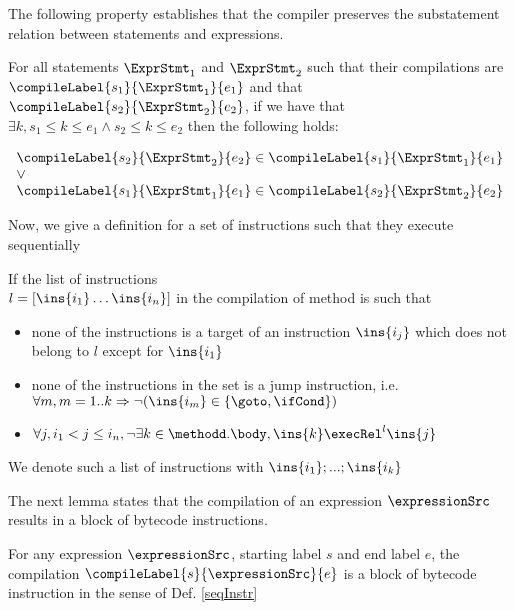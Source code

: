The following property establishes that the compiler preserves the substatement relation between statements and expressions.
\begin{compProp6}\label{compile:prop:compProp6}
For all statements $\ExprStmt_1$ and $\ExprStmt_2$ such that their compilations are 
 $\compileLabel{s_1}{\ExprStmt_1}{e_1} $ and that   $\compileLabel{s_2}{\ExprStmt_2}{e_2} $, if we have that 
$ \exists k,  s_1 \le k  \le e_1 \wedge s_2 \le k  \le e_2  $ then the following holds:

$$\begin{array}{l}
         \compileLabel{s_2}{\ExprStmt_2}{e_2}  \in \compileLabel{s_1}{\ExprStmt_1}{e_1}\\   
	 \vee \\
	 \compileLabel{s_1}{\ExprStmt_1}{e_1}  \in \compileLabel{s_2}{\ExprStmt_2}{e_2} 
\end{array}$$
\end{compProp6}

Now, we give a definition for a set of instructions such that they execute sequentially 
\begin{seqInstr} \label{seqInstr}
If the list of  instructions \\ $l  = \lbrack \ins{i_1} \ldots \ins{i_n} \rbrack$ in the compilation of method \methodd is such that 
 \begin{itemize}
              
      \item none of the instructions is a target of an instruction $\ins{i_j}$ which does not belong to $l$ except for $\ins{i_1}$
      \item none of the instructions in the set is a jump instruction, i.e. $\forall m, m = 1..k \Rightarrow \neg( \ins{i_m} \in  \{\goto, \ifCond\} )  $ 
      \item $  \forall j, i_1 <  j \le i_n , \neg \exists k \in \methodd.\body, \ins{k} \execRel^{l} \ins{j} $ 
 \end{itemize}

We denote such a list of instructions with $\ins{i_1};...;\ins{i_k}$

\end{seqInstr}


The next lemma states that the compilation of an expression $\expressionSrc$ results in
 a block of bytecode instructions.  
\begin{compProp3}\label{compile:prop:compProp3}
    For any expression $\expressionSrc$, starting label $s$ and end label $e$,
    the compilation $\compileLabel{s}{\expressionSrc}{e}$ is a block of bytecode instruction in the sense of Def. \ref{seqInstr}
   
\end{compProp3}

